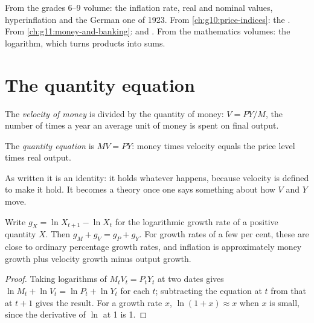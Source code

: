 \begin{recall}
From the grades 6--9 volume: the inflation rate, real and nominal values, hyperinflation and the German one of 1923. From \cref{ch:g10:price-indices}: the . From \cref{ch:g11:money-and-banking}:  and . From the mathematics volumes: the logarithm, which turns products into sums.
\end{recall}

\section{The quantity equation}\label{sec:g12:inflation-and-money:equation}

\begin{definition}\label{def:g12:inflation-and-money:velocity}
The \emph{velocity of money} is  divided by the quantity of money: $V = PY/M$, the number of times a year an average unit of money is
spent on final output.
\end{definition}

\begin{definition}\label{def:g12:inflation-and-money:quantity-equation}
The \emph{quantity equation} is $MV = PY$: money times velocity equals the price level times real output.
\end{definition}

As written it is an identity: it holds whatever happens, because velocity is defined to make it hold. It becomes a theory once one says something about how $V$ and $Y$
move.

\begin{proposition}\label{prop:g12:inflation-and-money:growth}
Write $g_X = \ln X_{t+1} - \ln X_t$ for the logarithmic growth rate of a positive quantity $X$. Then $g_M + g_V = g_P + g_Y$. For growth rates of a few per cent, these are close
to ordinary percentage growth rates, and inflation is approximately money growth plus velocity growth minus output growth.
\end{proposition}
\begin{proof}
Taking logarithms of $M_tV_t = P_tY_t$ at two dates gives $\ln M_t + \ln V_t = \ln P_t + \ln Y_t$ for each $t$; subtracting the equation at $t$ from that at $t + 1$ gives the
result. For a growth rate $x$, $\ln(1 + x) \approx x$ when $x$ is small, since the derivative of $\ln$ at 1 is 1.
\end{proof}

